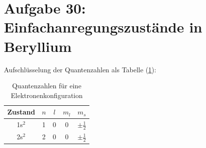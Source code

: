\documentclass[a4paper,12pt]{article}
\begin{document}
\section*{Aufgabe 30: Einfachanregungszustände in Beryllium}
Aufschlüsselung der Quantenzahlen als Tabelle (\ref{Quantenzahlen Beryllium a}):
\begin{table}[h!]
\centering
\begin{tabular}{c|c|c|c|c}
Zustand&$n$&$l$&$m_l$&$m_s$\\ \hline
1s${}^2$&1&0&0&$\pm\frac{1}{2}$ \\ \hline
2s${}^2$&2&0&0&$\pm\frac{1}{2}$
\end{tabular}
\caption{Quantenzahlen für eine Elektronenkonfiguration}
\label{Quantenzahlen Beryllium a}
\end{table}
\end{document}
